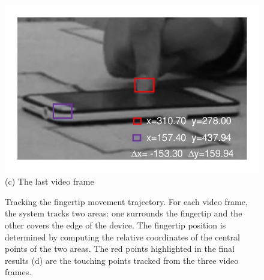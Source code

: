\begin{figure}[!t]
{\begin{minipage}[t]{0.23\textwidth}
                \includegraphics[width=1\textwidth]{fig/6--3.pdf}\\
                \centering  (c) The last video frame
                \end{minipage}
            }
            \hfill
            \caption{Tracking the fingertip movement trajectory. For each video frame, the system tracks two areas: one surrounds the fingertip and the other covers the edge of the device.
            The fingertip position is determined by computing the relative coordinates of the central points of the two areas.
            The red points highlighted in the final results (d) are the touching points tracked from the three video frames.}
            \label{fig:fig5}
        \end{figure}

